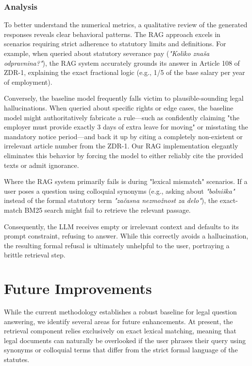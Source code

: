 \documentclass[fleqn,moreauthors,10pt]{ds_report}
\begin{document}
\subsubsection*{Analysis}

To better understand the numerical metrics, a qualitative review of the generated responses reveals clear behavioral patterns.
The RAG approach excels in scenarios requiring strict adherence to statutory limits and definitions.
For example, when queried about statutory severance pay (\textit{"Koliko znaša odpravnina?"}), the RAG system accurately grounds its answer in Article 108 of ZDR-1,
explaining the exact fractional logic (e.g., 1/5 of the base salary per year of employment).

Conversely, the baseline model frequently falls victim to plausible-sounding legal hallucinations.
When queried about specific rights or edge cases, the baseline model might authoritatively fabricate a rule---such as confidently claiming
"the employer must provide exactly 3 days of extra leave for moving" or misstating the mandatory notice period---and back it
up by citing a completely non-existent or irrelevant article number from the ZDR-1.
Our RAG implementation elegantly eliminates this behavior by forcing the model to either reliably cite the provided texts or admit ignorance.

Where the RAG system primarily fails is during "lexical mismatch" scenarios.
If a user poses a question using colloquial synonyms (e.g., asking about \textit{"bolniška"}
instead of the formal statutory term \textit{"začasna nezmožnost za delo"}),
the exact-match BM25 search might fail to retrieve the relevant passage.

Consequently, the LLM receives empty or irrelevant context and defaults to its prompt constraint, refusing to answer.
While this correctly avoids a hallucination, the resulting formal refusal is ultimately unhelpful to the user, portraying a brittle retrieval step.

\section*{Future Improvements}

While the current methodology establishes a robust baseline for legal question answering, we identify several areas for future enhancements.
At present, the retrieval component relies exclusively on exact lexical matching, meaning that legal documents can naturally be overlooked if the user phrases
their query using synonyms or colloquial terms that differ from the strict formal language of the statutes.
\end{document}
